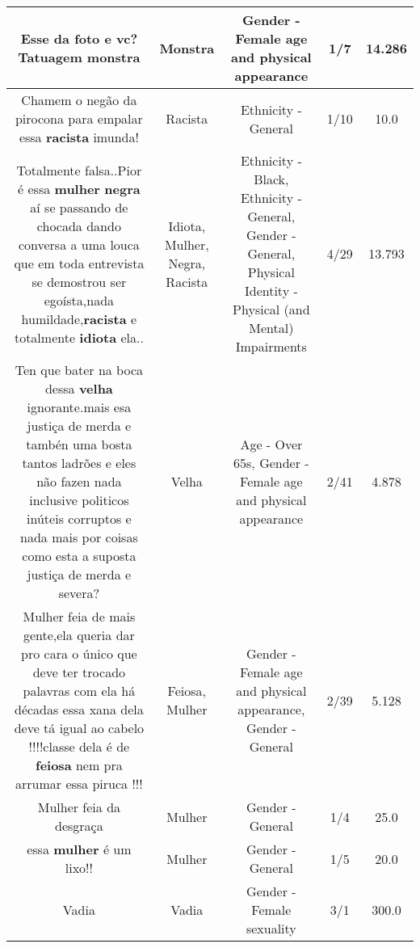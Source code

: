 \documentclass[11pt]{article}
\newlength\mylength
\begin{document}
\begin{center}
\begin{longtable}{|C{.65\mylength}|C{.30\mylength}|C{.12\mylength}|C{.12\mylength}|C{.12\mylength}|}
  \small Esse da foto e vc? Tatuagem monstra\normalsize   & Monstra & Gender - Female age and physical appearance & 1/7 & 14.286 \\  \hline
  \small Chamem o negão da pirocona para empalar essa \textbf{racista} imunda!\normalsize   & Racista & Ethnicity - General & 1/10 & 10.0 \\  \hline
  \small Totalmente falsa..Pior é essa \textbf{mulher} \textbf{negra} aí se passando de chocada dando conversa a uma louca que em toda entrevista se demostrou ser egoísta,nada humildade,\textbf{racista} e totalmente \textbf{idiota} ela..\normalsize   & Idiota, Mulher, Negra, Racista & Ethnicity - Black, Ethnicity - General, Gender - General, Physical Identity - Physical (and Mental) Impairments & 4/29 & 13.793 \\  \hline
  \small Ten que bater na boca dessa \textbf{v\textbf{elha}}   ignorante.mais esa justiça de merda e tambén uma bosta tantos ladrões e eles não fazen nada inclusive politicos inúteis corruptos e nada mais por coisas como esta a suposta justiça de merda e severa?\normalsize   & Velha & Age - Over 65s, Gender - Female age and physical appearance & 2/41 & 4.878 \\  \hline
  \small Mulher feia de mais gente,ela queria dar pro cara o único que deve ter trocado palavras com ela há décadas essa xana dela deve tá igual ao cabelo !!!!classe dela é de \textbf{feiosa}  nem pra arrumar essa piruca !!!\normalsize   & Feiosa, Mulher & Gender - Female age and physical appearance, Gender - General & 2/39 & 5.128 \\  \hline
  \small Mulher feia da desgraça\normalsize   & Mulher & Gender - General & 1/4 & 25.0 \\  \hline
  \small essa \textbf{mulher} é um lixo!!\normalsize   & Mulher & Gender - General & 1/5 & 20.0 \\  \hline
  \small Vadia\normalsize   & Vadia & Gender - Female sexuality & 3/1 & 300.0 \\  \hline

\end{longtable}
\end{center}
\end{document}
